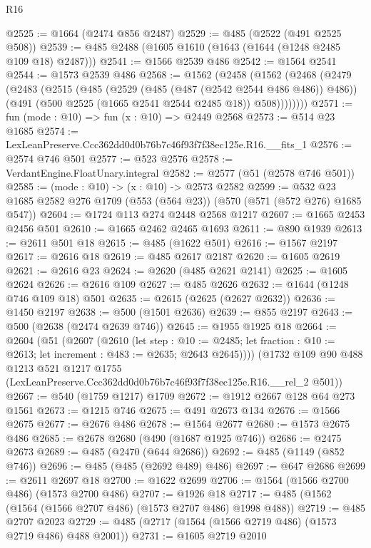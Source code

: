 \begin{lexlean}{R16}
\begin{coremodule}
@2525 := @1664 (@2474 @856 @2487)
@2529 := @485 (@2522 (@491 @2525 @508))
@2539 := @485 @2488 (@1605 @1610 (@1643 (@1644 (@1248 @2485 @109 @18) @2487)))
@2541 := @1566 @2539 @486
@2542 := @1564 @2541
@2544 := @1573 @2539 @486
@2568 := @1562
    (@2458
      (@1562
        (@2468
          (@2479
            (@2483
              (@2515
                (@485
                  (@2529 (@485 (@487 (@2542 @2544 @486 @486)) @486))
                  (@491 (@500 @2525 (@1665 @2541 @2544 @2485 @18)) @508))))))))
@2571 := fun (mode : @10) => fun (x : @10) => @2449 @2568
@2573 := @514 @23 @1685
@2574 := LexLeanPreserve.Ccc362dd0d0b76b7c46f93f7f38ec125e.R16.__fits_1
@2576 := @2574 @746 @501
@2577 := @523 @2576
@2578 := VerdantEngine.FloatUnary.integral
@2582 := @2577 (@51 (@2578 @746 @501))
@2585 := (mode : @10) -> (x : @10) -> @2573 @2582
@2599 := @532 @23 @1685 @2582 @276 @1709 (@553 (@564 @23)) (@570 (@571 (@572 @276) @1685 @547))
@2604 := @1724 @113 @274 @2448 @2568 @1217
@2607 := @1665 @2453 @2456 @501
@2610 := @1665 @2462 @2465 @1693
@2611 := @890 @1939
@2613 := @2611 @501 @18
@2615 := @485 (@1622 @501)
@2616 := @1567 @2197
@2617 := @2616 @18
@2619 := @485 @2617 @2187
@2620 := @1605 @2619
@2621 := @2616 @23
@2624 := @2620 (@485 @2621 @2141)
@2625 := @1605 @2624
@2626 := @2616 @109
@2627 := @485 @2626
@2632 := @1644 (@1248 @746 @109 @18) @501
@2635 := @2615 (@2625 (@2627 @2632))
@2636 := @1450 @2197
@2638 := @500 (@1501 @2636)
@2639 := @855 @2197
@2643 := @500 (@2638 (@2474 @2639 @746))
@2645 := @1955 @1925 @18
@2664 := @2604
    (@51
      (@2607
        (@2610
          (let step : @10 := @2485;
          let fraction : @10 := @2613; let increment : @483 := @2635; @2643 @2645))))
    (@1732
      @109
      @90
      @488
      @1213
      @521
      @1217
      @1755
      (LexLeanPreserve.Ccc362dd0d0b76b7c46f93f7f38ec125e.R16.__rel_2 @501))
@2667 := @540 (@1759 @1217) @1709
@2672 := @1912 @2667 @128 @64 @273 @1561
@2673 := @1215 @746
@2675 := @491 @2673 @134
@2676 := @1566 @2675
@2677 := @2676 @486
@2678 := @1564 @2677
@2680 := @1573 @2675 @486
@2685 := @2678 @2680 (@490 (@1687 @1925 @746))
@2686 := @2475 @2673
@2689 := @485 (@2470 (@644 @2686))
@2692 := @485 (@1149 (@852 @746))
@2696 := @485 (@485 (@2692 @489) @486)
@2697 := @647 @2686
@2699 := @2611 @2697 @18
@2700 := @1622 @2699
@2706 := @1564 (@1566 @2700 @486) (@1573 @2700 @486)
@2707 := @1926 @18
@2717 := @485 (@1562 (@1564 (@1566 @2707 @486) (@1573 @2707 @486) @1998 @488))
@2719 := @485 @2707 @2023
@2729 := @485 (@2717 (@1564 (@1566 @2719 @486) (@1573 @2719 @486) @488 @2001))
@2731 := @1605 @2719 @2010

\end{coremodule}
\end{lexlean}
